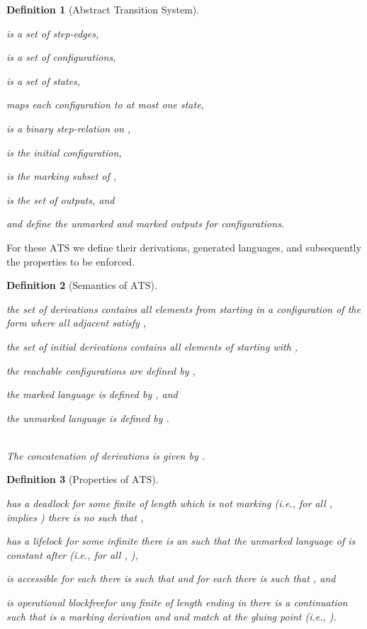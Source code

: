 \documentclass[draft]{ifacconf}
\newtheorem{definition}{Definition}
\newcommand{\ATS}{\ensuremath{\mathrm{ATS}}\xspace}
\newcommand{\OBF}{operational blockfree\xspace}
\begin{document}
\begin{definition}[Abstract Transition System]\label{def:ATS}\leavevmode\\
 \IFFtext
\begin{inparaenum}[(i)]
\item  is a set of step-edges,
\item  is a set of configurations,
\item  is a set of states,
\item  maps each configuration to at most one state,
\item  is a binary step-relation on ,
\item  is the initial configuration,
\item  is the marking subset of ,
\item  is the set of outputs, and
\item  and  define the unmarked and marked outputs for configurations.
\end{inparaenum}
\end{definition}
For these \ATS we define their derivations, generated languages, and subsequently the properties to be enforced.
\begin{definition}[Semantics of \ATS]\begin{inparaenum}[(i)]
\item the set of derivations  contains all elements from  starting in a configuration of the form  where all adjacent  satisfy ,
\item the set of initial derivations  contains all elements of  starting with ,
\item the reachable configurations  are defined by ,
\item the marked language  is defined by , and
\item the unmarked language  is defined by .
\end{inparaenum}\\
The concatenation of derivations  is given by .
\end{definition}
\begin{definition}[Properties of \ATS]\label{ATS:props}
\begin{inparaenum}[(i)]
\item  has a deadlock \IFFtext for some finite  of length  which is not marking (i.e., for all ,  implies ) there is no  such that ,
\item  has a lifelock \IFF for some infinite  there is an  such that the unmarked language of  is constant after  (i.e., for all , ),
\item  is accessible \IFF for each  there is  such that  and
for each  there is  such that , and
\item  is \OBF \IFF for any finite  of length  ending in  there is a continuation  such that  is a marking derivation and  and  match at the gluing point  (i.e., ).
\end{inparaenum}
\end{definition}
\end{document}
